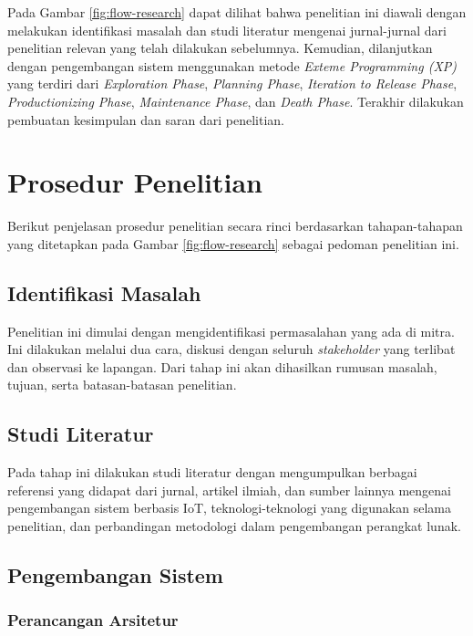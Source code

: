 Pada Gambar \ref{fig:flow-research} dapat dilihat bahwa penelitian ini diawali dengan melakukan identifikasi masalah dan studi literatur mengenai jurnal-jurnal dari penelitian relevan yang telah dilakukan sebelumnya. Kemudian, dilanjutkan dengan pengembangan sistem menggunakan metode \textit{Exteme Programming (XP)} yang terdiri dari \textit{Exploration Phase}, \textit{Planning Phase}, \textit{Iteration to Release Phase}, \textit{Productionizing Phase}, \textit{Maintenance Phase}, dan \textit{Death Phase}. Terakhir dilakukan pembuatan kesimpulan dan saran dari penelitian.

\section{Prosedur Penelitian}

Berikut penjelasan prosedur penelitian secara rinci berdasarkan tahapan-tahapan yang ditetapkan pada Gambar \ref{fig:flow-research} sebagai pedoman penelitian ini.

\subsection{Identifikasi Masalah}

Penelitian ini dimulai dengan mengidentifikasi permasalahan yang ada di mitra. Ini dilakukan melalui dua cara, diskusi dengan seluruh \textit{stakeholder} yang terlibat dan observasi ke lapangan. Dari tahap ini akan dihasilkan rumusan masalah, tujuan, serta batasan-batasan penelitian.

\subsection{Studi Literatur}

Pada tahap ini dilakukan studi literatur dengan mengumpulkan berbagai referensi yang didapat dari jurnal, artikel ilmiah, dan sumber lainnya mengenai pengembangan sistem berbasis IoT, teknologi-teknologi yang digunakan selama penelitian, dan perbandingan metodologi dalam pengembangan perangkat lunak.

\subsection{Pengembangan Sistem}

\subsubsection{Perancangan Arsitetur}

